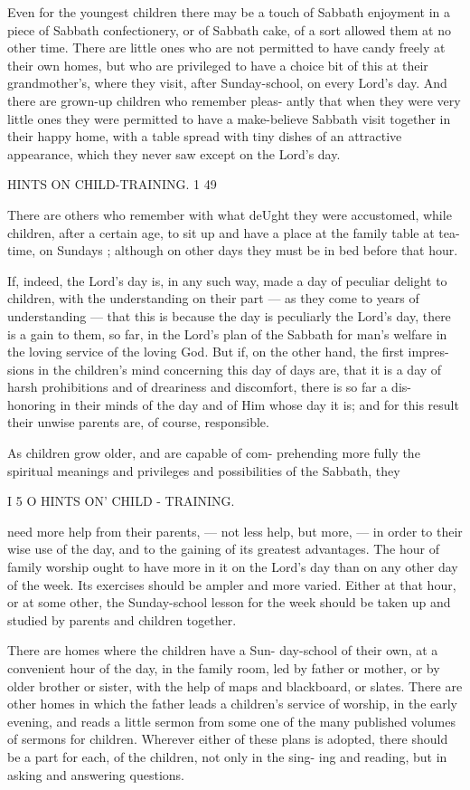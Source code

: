 \documentclass[
]{book}
\begin{document}
Even for the youngest children there may be a touch of Sabbath enjoyment in a piece of Sabbath confectionery, or of Sabbath cake, of a sort allowed them at no other time. There are little ones who are not permitted to have candy freely at their own homes, but who are privileged to have a choice bit of this at their grandmother's, where they visit, after Sunday-school, on every Lord's day. And there are grown-up children who remember pleas- antly that when they were very little ones they were permitted to have a make-believe Sabbath visit together in their happy home, with a table spread with tiny dishes of an attractive appearance, which they never saw except on the Lord's day.

HINTS ON CHILD-TRAINING. 1 49

There are others who remember with what deUght they were accustomed, while children, after a certain age, to sit up and have a place at the family table at tea-time, on Sundays ; although on other days they must be in bed before that hour.

If, indeed, the Lord's day is, in any such way, made a day of peculiar delight to children, with the understanding on their part --- as they come to years of understanding --- that this is because the day is peculiarly the Lord's day, there is a gain to them, so far, in the Lord's plan of the Sabbath for man's welfare in the loving service of the loving God. But if, on the other hand, the first impres- sions in the children's mind concerning this day of days are, that it is a day of harsh prohibitions and of dreariness and discomfort, there is so far a dis- honoring in their minds of the day and of Him whose day it is; and for this result their unwise parents are, of course, responsible.

As children grow older, and are capable of com- prehending more fully the spiritual meanings and privileges and possibilities of the Sabbath, they

I 5 O HINTS ON' CHILD - TRAINING.

need more help from their parents, --- not less help, but more, --- in order to their wise use of the day, and to the gaining of its greatest advantages. The hour of family worship ought to have more in it on the Lord's day than on any other day of the week. Its exercises should be ampler and more varied. Either at that hour, or at some other, the Sunday-school lesson for the week should be taken up and studied by parents and children together.

There are homes where the children have a Sun- day-school of their own, at a convenient hour of the day, in the family room, led by father or mother, or by older brother or sister, with the help of maps and blackboard, or slates. There are other homes in which the father leads a children's service of worship, in the early evening, and reads a little sermon from some one of the many published volumes of sermons for children. Wherever either of these plans is adopted, there should be a part for each, of the children, not only in the sing- ing and reading, but in asking and answering questions.
\end{document}

